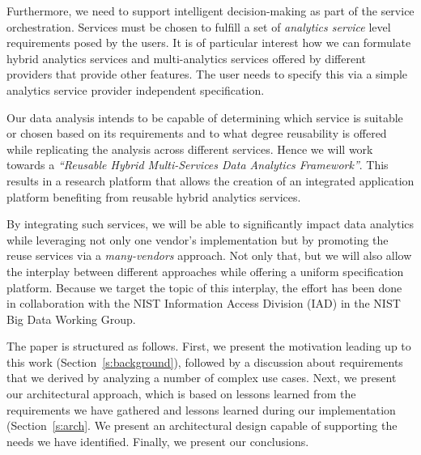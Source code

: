 Furthermore, we need to support intelligent decision-making as part of
the service orchestration. Services must be chosen to fulfill a set of
{\em analytics service} level requirements posed by the users. It is
of particular interest how we can formulate hybrid analytics services
and multi-analytics services offered by different providers that
provide other features. The user needs to specify this via a simple
analytics service provider independent specification.

Our data analysis intends to be capable of determining which service is
suitable or chosen based on its requirements and to what degree
reusability is offered while replicating the analysis across different
services. Hence we will work towards a {\em ``Reusable Hybrid
Multi-Services Data Analytics Framework''}. This results in a research
platform that allows the creation of an integrated application
platform benefiting from reusable hybrid analytics services.


By integrating such services, we will be able to significantly impact
data analytics while leveraging not only one vendor's implementation
but by promoting the reuse services via a {\em many-vendors}
approach. Not only that, but we will also allow the interplay between
different approaches while offering a uniform specification platform.
Because we target the topic of this interplay, the effort has been
done in collaboration with the NIST Information Access Division (IAD)
in the NIST Big Data Working Group.%

The paper is structured as follows. First, we present the motivation
leading up to this work (Section~\ref{s:background}), followed by a
discussion about requirements that we derived by analyzing a number of
complex use cases. Next, we present our architectural approach, which is
based on lessons learned from the requirements we have gathered and
lessons learned during our implementation (Section~\ref{s:arch}. We
present an architectural design capable of supporting the needs we
have identified. Finally, we present our conclusions.

